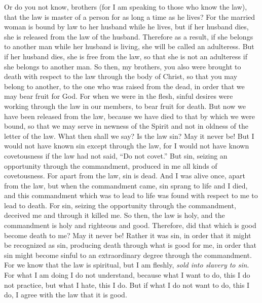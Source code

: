 \begin{biblechapter} %
 Or do you not know, brothers (for I am speaking to those who know the law), that the law is master of a person for as long a time as he lives?
\verse For the married woman is bound by law to her husband while he lives, but if her husband dies, she is released from the law of the husband.
\verse Therefore as a result, if she belongs to another man while her husband is living, she will be called an adulteress. But if her husband dies, she is free from the law, so that she is not an adulteress if she belongs to another man.
\verse So then, my brothers, you also were brought to death with respect to the law through the body of Christ, so that you may belong to another, to the one who was raised from the dead, in order that we may bear fruit for God.
\verse For when we were in the flesh, sinful desires were working through the law in our members, to bear fruit for death.
\verse But now we have been released from the law, because we have died to that by which we were bound, so that we may serve in newness of the Spirit and not in oldness of the letter of the law.
 What then shall we say? Is the law sin? May it never be! But I would not have known sin except through the law, for I would not have known covetousness if the law had not said, “Do not covet.”
\verse But sin, seizing an opportunity through the commandment, produced in me all kinds of covetousness. For apart from the law, sin is dead.
\verse And I was alive once, apart from the law, but when the commandment came, sin sprang to life
\verse and I died, and this commandment which was to lead to life was found with respect to me to lead to death.
\verse For sin, seizing the opportunity through the commandment, deceived me and through it killed me.
\verse So then, the law is holy, and the commandment is holy and righteous and good.
 Therefore, did that which is good become death to me? May it never be! Rather it was sin, in order that it might be recognized as sin, producing death through what is good for me, in order that sin might become sinful to an extraordinary degree through the commandment.
\verse For we know that the law is spiritual, but I am fleshly, \textit{sold into slavery to sin}.
\verse For what I am doing I do not understand, because what I want to do, this I do not practice, but what I hate, this I do.
\verse But if what I do not want to do, this I do, I agree with the law that it is good.

\end{biblechapter}
